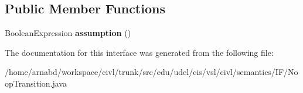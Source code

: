\subsection*{Public Member Functions}
\begin{DoxyCompactItemize}
\item 
\hypertarget{interfaceedu_1_1udel_1_1cis_1_1vsl_1_1civl_1_1semantics_1_1IF_1_1NoopTransition_ab9ea4b1b99ef296c7164b908a67b6eeb}{}Boolean\+Expression {\bfseries assumption} ()\label{interfaceedu_1_1udel_1_1cis_1_1vsl_1_1civl_1_1semantics_1_1IF_1_1NoopTransition_ab9ea4b1b99ef296c7164b908a67b6eeb}

\end{DoxyCompactItemize}


The documentation for this interface was generated from the following file\+:\begin{DoxyCompactItemize}
\item 
/home/arnabd/workspace/civl/trunk/src/edu/udel/cis/vsl/civl/semantics/\+I\+F/Noop\+Transition.\+java\end{DoxyCompactItemize}
